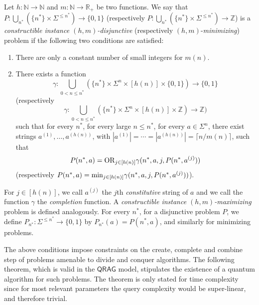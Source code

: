 \documentclass[12pt]{article}
\newcommand{\N}{\mathbb{N}}
\newcommand{\R}{\mathbb{R}}
\newcommand{\Z}{\mathbb{Z}}
\theoremstyle{definition}
\begin{document}
Let $h: \N \rightarrow \N$ and $m:\N\rightarrow\R_+$ be two functions. 
We say that $P: \bigcup_{n^*} (\{n^*\} \times \Sigma^{\leq n^*}) \rightarrow \{0,1\}$ (respectively $P: \bigcup_{n^*} (\{n^*\} \times \Sigma^{\leq n^*}) \rightarrow \Z$) is a {\em constructible instance $(h,m)$-disjunctive} (respectively $(h,m)$-{\em minimizing}) problem if the following two conditions are satisfied: 
\begin{enumerate}
\item
There are only a constant number of small integers for $m(n)$. 
\item
There exists a function
$$\gamma :  \bigcup_{0 < n \leq n^*} (\{n^*\} \times \Sigma^{n}  \times [h(n)] \times  \{0,1\} ) \rightarrow  \{0,1\} $$
(respectively
$$\gamma : \bigcup_{0 < n \leq n^*} (\{n^*\} \times \Sigma^{n}  \times [h(n)] \times  \Z ) \rightarrow  \Z )$$
such that for every $n^*$, for every large $n \leq n^*$, for every $a \in \Sigma^{n}$, there exist strings $a^{(1)}, \ldots , a^{(h(n))}$, with $|a^{(1)}| = \cdots = |a^{(h(n))}| = \lceil n/m(n)\rceil$, 
such that
$$P(n^*, a) = {\rm OR}_{j \in [h(n)]} \gamma(n^*, a, j, P(n^*, a^{(j)}))$$ 
(respectively $P(n^*, a) = {\rm \min}_{j \in [h(n)]} \gamma(n^*, a, j, P(n^*, a^{(j)}))$).
\end{enumerate}
For $j \in [h(n)]$, we call $a^{(j)}$ the $j$th  {\em constitutive} string of $a$ and we call the function $\gamma$ the  {\em completion} function.
A {\em constructible instance $(h,m)$-maximizing} problem is defined analogously. For every $n^*$, for a disjunctive problem $P$,
we define $P_{n^*} : \Sigma^{\leq n^*} \rightarrow \{0,1\}$ by  $P_{n^*}(a) = P(n^*, a)$, and similarly for minimizing problems.

The above conditions impose constraints on the create, complete and combine step of problems amenable to divide and conquer algorithms. The following theorem, which is valid in the $\mathsf{QRAG}$ model, stipulates the existence of a quantum algorithm for such problems.
The theorem is only stated for time complexity since for most relevant parameters the query complexity would be super-linear, and therefore trivial.
\end{document}
